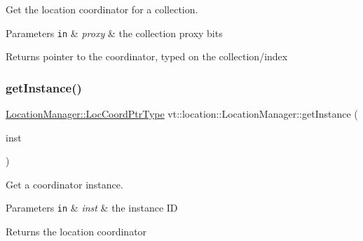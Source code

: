 Get the location coordinator for a collection. 


\begin{DoxyParams}[1]{Parameters}
\mbox{\tt in}  & {\em proxy} & the collection proxy bits\\
\hline
\end{DoxyParams}
\begin{DoxyReturn}{Returns}
pointer to the coordinator, typed on the collection/index 
\end{DoxyReturn}
\mbox{\label{structvt_1_1location_1_1_location_manager_a1533939b198e3d7a2d5298995b87ab21}} 
\subsubsection{\texorpdfstring{get\+Instance()}{getInstance()}}
{\footnotesize\ttfamily \hyperlink{structvt_1_1location_1_1_location_manager_a98ed824c058080e538546fc731cb8f4c}{Location\+Manager\+::\+Loc\+Coord\+Ptr\+Type} vt\+::location\+::\+Location\+Manager\+::get\+Instance (\begin{DoxyParamCaption}\item[{\hyperlink{namespacevt_1_1location_a4db6456e8024af2d23fc5ae560fef866}{Loc\+Inst\+Type} const}]{inst }\end{DoxyParamCaption})\hspace{0.3cm}{\ttfamily [static]}}



Get a coordinator instance. 


\begin{DoxyParams}[1]{Parameters}
\mbox{\tt in}  & {\em inst} & the instance ID\\
\hline
\end{DoxyParams}
\begin{DoxyReturn}{Returns}
the location coordinator 
\end{DoxyReturn}
\mbox{\label{structvt_1_1location_1_1_location_manager_ae62f2826ad6bebc5dcad0d6ad13af365}} 
